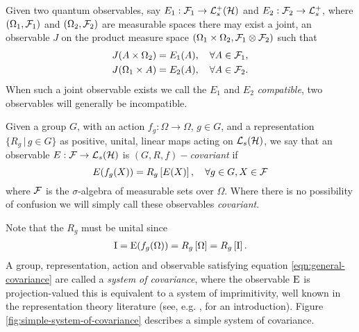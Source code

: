 Given two quantum observables, say $E_1:\fcal_1\to\posops[\hcal]$ and $E_2:\fcal_2\to\posops$, where $(\Omega_1, \mathcal{F}_1)$ and $(\Omega_2,\mathcal{F}_2)$ are measurable spaces there may exist a joint, an observable $J$ on the product measure space $(\Omega_1\times\Omega_2, \mathcal{F}_1\otimes\mathcal{F}_2)$ such that
\begin{align}
  J(A \times\Omega_2) &= E_1(A), \quad \forall A\in\mathcal{F}_1,\\
  J(\Omega_1\times A) &= E_2(A), \quad \forall A\in\mathcal{F}_2.
\end{align}
When such a joint observable exists we call the $E_1$ and $E_2$ \emph{compatible}, two observables will generally be incompatible.
\begin{defn}\label{defn:grf-cov-obs}
Given a group $G$, with an action $f_g:\Omega\to\Omega$, $g\in G$, and a representation $\{R_g\, | \, g\in G\}$ as positive, unital, linear maps acting on $\saops[\hcal]$, we say that an observable $E:\fcal\to\saops[\hcal]$ is $(G,R,f)-$\emph{covariant} if
\begin{equation}\label{eqn:general-covariance}
  E(f_g(X)) = R_g \left[E(X)\right], \quad \forall g\in G, X\in\mathcal{F}
\end{equation}
where $\mathcal{F}$ is the $\sigma$-algebra of measurable sets over $\Omega$. Where there is no possibility of confusion we will simply call these observables \emph{covariant}. 
\end{defn}
\noindent Note that the $R_g$ must be unital since
\begin{align}
  \operatorname{I} =  \operatorname{E}(f_g(\Omega)) = R_g\left[\Omega\right] = R_g\left[\operatorname{I}\right].
\end{align}
A group, representation, action and observable satisfying equation \eqref{eqn:general-covariance} are called a \emph{system of covariance}, where the observable $\operatorname{E}$ is projection-valued this is equivalent to a system of imprimitivity, well known in the representation theory literature (see, e.g. \cite{mackey-1976}, for an introduction). Figure \ref{fig:simple-system-of-covariance} describes a simple system of covariance.
\newcommand{\drawDevice}[3]{%
\begin{tikzpicture}[line join=round, overlay, remember picture, scale = #3]%
\begin{scope}[shift={#1}]%
\draw[thick, rounded corners = 0, draw=magenta,fill = magenta, opacity=0.3] (0,0,1) rectangle (1,1,1);
\draw[thick, rounded corners = 0, draw=magenta,fill =  magenta, opacity=0.3] (0,1,1) -- (0,1,0) -- (1,1,0) -- (1,1,1) -- cycle;
\draw[thick, rounded corners = 0, draw=magenta,fill = magenta, opacity=0.3] (1,1,0) -- (1,0,0) -- (1,0,1) -- (1,1,1) -- cycle;
\node[] at (0.5,0.5,1) {{#2}};
\end{scope}
\end{tikzpicture}%
}

